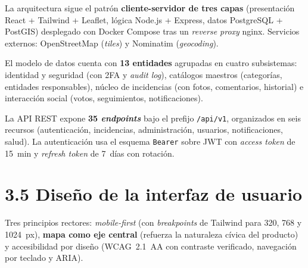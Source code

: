 La arquitectura sigue el patrón \textbf{cliente-servidor de tres capas} (presentación React + Tailwind + Leaflet, lógica Node.js + Express, datos PostgreSQL + PostGIS) desplegado con Docker Compose tras un \textit{reverse proxy} nginx. Servicios externos: OpenStreetMap (\textit{tiles}) y Nominatim (\textit{geocoding}).

El modelo de datos cuenta con \textbf{13 entidades} agrupadas en cuatro subsistemas: identidad y seguridad (con 2FA y \textit{audit log}), catálogos maestros (categorías, entidades responsables), núcleo de incidencias (con fotos, comentarios, historial) e interacción social (votos, seguimientos, notificaciones).

La API REST expone \textbf{35 \textit{endpoints}} bajo el prefijo \texttt{/api/v1}, organizados en seis recursos (autenticación, incidencias, administración, usuarios, notificaciones, salud). La autenticación usa el esquema \texttt{Bearer} sobre JWT con \textit{access token} de 15~min y \textit{refresh token} de 7~días con rotación.


\section*{3.5 Diseño de la interfaz de usuario}

Tres principios rectores: \textit{mobile-first} (con \textit{breakpoints} de Tailwind para 320, 768 y 1024~px), \textbf{mapa como eje central} (refuerza la naturaleza cívica del producto) y accesibilidad por diseño (WCAG~2.1~AA con contraste verificado, navegación por teclado y ARIA).
